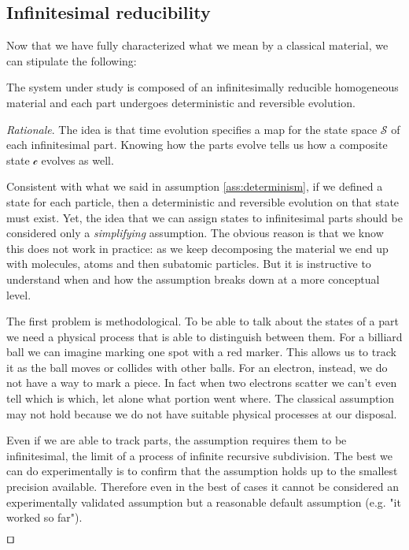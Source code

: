 \documentclass[smallextended]{svjour3}
\numberwithin{equation}{section}
\newenvironment{rationale}{\emph{Rationale}.}{\hfill\(\qed\)}
\begin{document}
\subsection{Infinitesimal reducibility}

Now that we have fully characterized what we mean by a classical material, we can stipulate the following:

\begin{assump}\label{ass:infinitesimal_reducibility}
	The system under study is composed of an infinitesimally reducible homogeneous material and each part undergoes deterministic and reversible evolution.
\end{assump}

\begin{rationale}
	The idea is that time evolution specifies a map for the state space $\mathcal{S}$ of each infinitesimal part. Knowing how the parts evolve tells us how a composite state $\mathcal{c}$ evolves as well.
	
	Consistent with what we said in assumption \ref{ass:determinism}, if we defined a state for each particle, then a deterministic and reversible evolution on that state must exist. Yet, the idea that we can assign states to infinitesimal parts should be considered only a \emph{simplifying} assumption. The obvious reason is that we know this does not work in practice: as we keep decomposing the material we end up with molecules, atoms and then subatomic particles. But it is instructive to understand when and how the assumption breaks down at a more conceptual level.
	
	The first problem is methodological. To be able to talk about the states of a part we need a physical process that is able to distinguish between them. For a billiard ball we can imagine marking one spot with a red marker. This allows us to track it as the ball moves or collides with other balls. For an electron, instead, we do not have a way to mark a piece. In fact when two electrons scatter we can't even tell which is which, let alone what portion went where. The classical assumption may not hold because we do not have suitable physical processes at our disposal.
	
    Even if we are able to track parts, the assumption requires them to be infinitesimal, the limit of a process of infinite recursive subdivision. The best we can do experimentally is to confirm that the assumption holds up to the smallest precision available. Therefore even in the best of cases it cannot be considered an experimentally validated assumption but a reasonable default assumption (e.g. "it worked so far").
	

\end{rationale}
\end{document}
